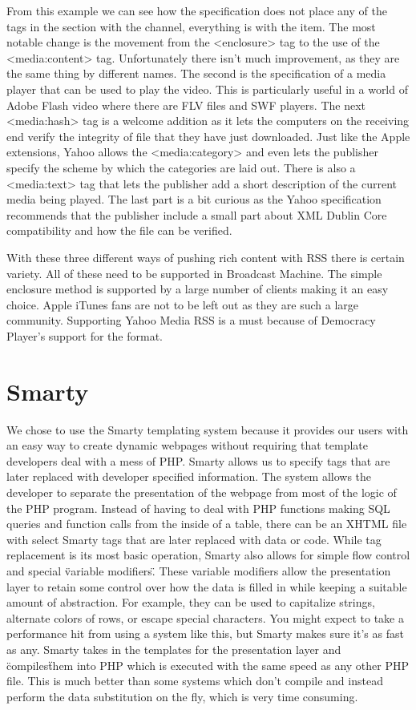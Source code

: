 \documentclass[a4paper,12pt]{report}
\begin{document}
From this example we can see how the specification does not place any of the tags in the section with the channel, everything is with the item.
The most notable change is the movement from the <enclosure> tag to the use of the <media:content> tag.
Unfortunately there isn't much improvement, as they are the same thing by different names.
The second is the specification of a media player that can be used to play the video.
This is particularly useful in a world of Adobe Flash video where there are FLV files and SWF players.
The next <media:hash> tag is a welcome addition as it lets the computers on the receiving end verify the integrity of file that they have just downloaded.
Just like the Apple extensions, Yahoo allows the <media:category> and even lets the publisher specify the scheme by which the categories are laid out.
There is also a <media:text> tag that lets the publisher add a short description of the current media being played.
The last part is a bit curious as the Yahoo specification recommends that the publisher include a small part about XML Dublin Core compatibility and how the file can be verified.

With these three different ways of pushing rich content with RSS there is certain variety.
All of these need to be supported in Broadcast Machine.
The simple enclosure method is supported by a large number of clients making it an easy choice.
Apple iTunes fans are not to be left out as they are such a large community.
Supporting Yahoo Media RSS is a must because of Democracy Player's support for the format.


\section{Smarty}
We chose to use the Smarty templating system because it provides our users with an easy way to create dynamic webpages without requiring that template developers deal with a mess of PHP. 
Smarty allows us to specify tags that are later replaced with developer specified information.
The system allows the developer to separate the presentation of the webpage from most of the logic of the PHP program. 
Instead of having to deal with PHP functions making SQL queries and function calls from the inside of a table, there can be an XHTML file with select Smarty tags that are later replaced with data or code.
While tag replacement is its most basic operation, Smarty also allows for simple flow control and special \"variable modifiers\".
These variable modifiers allow the presentation layer to retain some control over how the data is filled in while keeping a suitable amount of abstraction.
For example, they can be used to capitalize strings, alternate colors of rows, or escape special characters.
You might expect to take a performance hit from using a system like this, but Smarty makes sure it's as fast as any.
Smarty takes in the templates for the presentation layer and \"compiles\" them into PHP which is executed with the same speed as any other PHP file.
This is much better than some systems which don't compile and instead perform the data substitution on the fly, which is very time consuming. 
\end{document}

